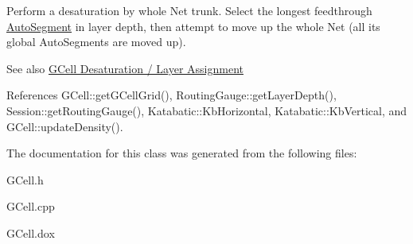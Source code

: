 Perform a desaturation by whole Net trunk. Select the longest feedthrough \hyperlink{classKatabatic_1_1AutoSegment}{Auto\+Segment} in layer {\ttfamily depth}, then attempt to move up the whole Net (all it\textquotesingle{}s global Auto\+Segments are moved up).

\begin{DoxySeeAlso}{See also}
\hyperlink{classKatabatic_1_1GCell_secGCellDesaturation}{G\+Cell Desaturation / Layer Assignment} 
\end{DoxySeeAlso}


References G\+Cell\+::get\+G\+Cell\+Grid(), Routing\+Gauge\+::get\+Layer\+Depth(), Session\+::get\+Routing\+Gauge(), Katabatic\+::\+Kb\+Horizontal, Katabatic\+::\+Kb\+Vertical, and G\+Cell\+::update\+Density().



The documentation for this class was generated from the following files\+:\begin{DoxyCompactItemize}
\item 
G\+Cell.\+h\item 
G\+Cell.\+cpp\item 
G\+Cell.\+dox\end{DoxyCompactItemize}
